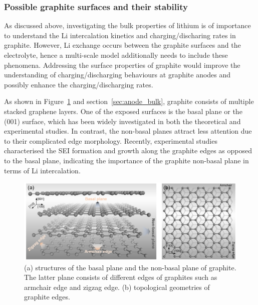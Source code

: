 \documentclass[../main.tex]{subfiles}
\begin{document}
\subsubsection{Possible graphite surfaces and their stability}

As discussed above, investigating the bulk properties of lithium is of importance to understand the Li intercalation kinetics and charging/discharing rates in graphite. However, Li exchange occurs between the graphite surfaces and the electrolyte, hence a multi-scale model additionally needs to include these phenomena. Addressing the surface properties of graphite would improve the understanding of charging/discharging behaviours at graphite anodes and possibly enhance the charging/discharging rates.

As shown in Figure~\ref{fig:graphite_surfs} and section~\ref{sec:anode_bulk}, graphite consists of multiple stacked graphene layers. One of the exposed surfaces is the basal plane or the (001) surface, which has been widely investigated in both the theoretical and experimental studies.\cite{thinius2014theoretical,persson2010,toyoura2010effects,yao2012diffusion,nuli2006intercalation} In contrast, the non-basal planes attract less attention due to their complicated edge morphology. Recently, experimental studies characterised the SEI formation and growth along the graphite edges as opposed to the basal plane, \cite{liu2019situ,zhang2020operando} indicating the importance of the graphite non-basal plane in terms of Li intercalation.

\begin{figure}
    \centering
    \includegraphics[scale=0.4]{figures/Graphite_surfs.png}
    \caption{(a) structures of the basal plane and the non-basal plane of graphite. The latter plane consists of different edges of graphites such as armchair edge and zigzag edge. (b) topological geometries of graphite edges.}
    \label{fig:graphite_surfs}
\end{figure}
\end{document}
